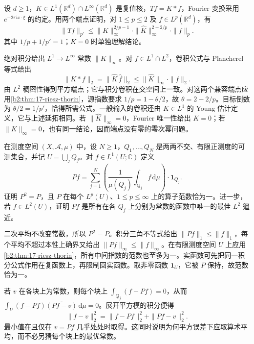 \begin{exercise}\label{b2:ex:17-new-6}
设 \(d\geq1\)，\(K\in L^1(\mathbb R^d)\cap L^\infty(\mathbb R^d)\) 是复值核，\(Tf=K*f\)，Fourier 变换采用 \(e^{-2\pi\mathrm ix\cdot\xi}\) 的约定。用两个端点证明，对 \(1\leq p\leq2\) 及 \(f\in L^p(\mathbb R^d)\)，有
\[
 \|Tf\|_{p'}\leq\|K\|_\infty^{2/p-1}\cdot
 \|\widehat K\|_\infty^{2-2/p}\cdot\|f\|_p.
\]
其中 \(1/p+1/p'=1\)；\(K=0\) 时单独理解结论。
\end{exercise}
\begin{solution}
绝对积分给出 \(L^1\to L^\infty\) 常数 \(\|K\|_\infty\)。对 \(f\in L^1\cap L^2\)，卷积公式与 Plancherel 等式给出
\[
 \|K*f\|_2=\|\widehat K\,\widehat f\|_2
 \leq\|\widehat K\|_\infty\cdot\|f\|_2.
\]
由 \(L^2\) 稠密性得到平方端点；它与积分卷积在交空间上一致。对这两个兼容端点应用\cref{b2:thm:17-riesz-thorin}，源指数要求 \(1/p=1-\theta/2\)，故 \(\theta=2-2/p\)。目标倒数为 \(\theta/2=1/p'\)，恰得所需公式。一般输入的卷积还由 \(K\in L^1\) 的 Young 估计定义，它与上述延拓相同。若 \(\|\widehat K\|_\infty=0\)，Fourier 唯一性给出 \(K=0\)；若 \(\|K\|_\infty=0\)，也有同一结论，因而端点没有零的零次幂问题。
\end{solution}

\begin{exercise}\label{b2:ex:17-new-7}
在测度空间 \((X,\mathcal A,\mu)\) 中，设 \(N\geq1\)，\(Q_1,\ldots,Q_N\) 是两两不交、有限正测度的可测集合，并记 \(U=\bigcup_jQ_j\)。对 \(f\in L^1(U;\mathbb C)\) 定义
\[
 Pf=\sum_{j=1}^N\left(\frac1{\mu(Q_j)}\int_{Q_j}f\,\mathrm d\mu\right)\cdot\mathbf1_{Q_j}.
\]
证明 \(P^2=P\)，且 \(P\) 在每个 \(L^p(U)\)、\(1\leq p\leq\infty\) 上的算子范数恰为一。进一步，若 \(f\in L^2(U)\)，证明 \(Pf\) 是所有在各 \(Q_j\) 上分别为常数的函数中唯一的最佳 \(L^2\) 逼近。
\end{exercise}
\begin{solution}
二次平均不改变常数，所以 \(P^2=P\)。积分三角不等式给出 \(\|Pf\|_1\leq\|f\|_1\)，每个平均不超过本性上确界又给出 \(\|Pf\|_\infty\leq\|f\|_\infty\)。在有限测度空间 \(U\) 上应用\cref{b2:thm:17-riesz-thorin}，所有中间指数的范数也至多为一。实函数可先把同一积分公式作用在复函数上，再限制回实函数。取非零函数 \(\mathbf1_U\)，它被 \(P\) 保持，故范数恰为一。

若 \(v\) 在各块上为常数，则每个块上 \(\int_{Q_j}(f-Pf)=0\)，从而
\(\int_U(f-Pf)\overline{(Pf-v)}\,\mathrm d\mu=0\)。展开平方模的积分便得
\[
 \|f-v\|_2^2=\|f-Pf\|_2^2+\|Pf-v\|_2^2.
\]
最小值在且仅在 \(v=Pf\) 几乎处处时取得。这同时说明为何平方误差下应取算术平均，而不必另猜每个块上的最优常数。
\end{solution}

